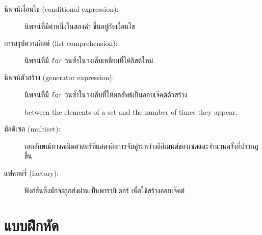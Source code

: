 \begin{description}

\item[นิพจน์เงื่อนไข (conditional expression):] นิพจน์ที่มีค่าหนึ่งในสองค่า ขึ้นอยู่กับเงื่อนไข

\item[การสรุปความลิสต์ (list comprehension):] นิพจน์ที่มี {\tt for} วนซ้ำในวงเล็บเหลี่ยมที่ให้ลิสต์ใหม่

\item[นิพจน์ตัวสร้าง (generator expression):] นิพจน์ที่มี {\tt for}  วนซ้ำในวงเล็บที่ให้ผลลัพธ์เป็นออบเจ๊คต์ตัวสร้าง

between the elements of a set and the number of times they appear.
\item[มัลติเซต (multiset):] เอกลักษณ์ทางคณิตศาสตร์ที่แสดงถึงการจับคู่ระหว่างอีลีเมนต์ของเซตและจำนวนครั้งที่ปรากฏขึ้น

\item[แฟคทอรี่ (factory):] ฟังก์ชันซึ่งมักจะถูกส่งผ่านเป็นพารามิเตอร์ เพื่อใช้สร้างออบเจ๊คต์

\end{description}




\section{แบบฝึกหัด}

